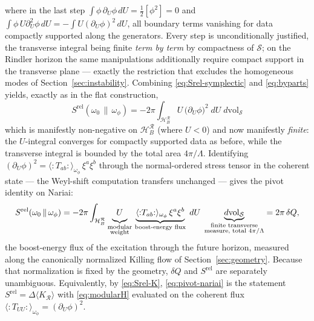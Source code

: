 \documentclass[11pt]{article}
\newcommand{\Srel}{S^{\mathrm{rel}}}
\newcommand{\Nariai}{Nariai}
\begin{document}
where in the last step $\int \phi\,\partial_U\phi\, dU = \tfrac{1}{2}[\phi^2] = 0$ and $\int \phi\, U \partial_U^2\phi\, dU = -\int U (\partial_U\phi)^2\, dU$, all boundary terms vanishing for data compactly supported along the generators. Every step is unconditionally justified, the transverse integral being finite \emph{term by term} by compactness of $\mathcal{S}$; on the Rindler horizon the same manipulations additionally require compact support in the transverse plane --- exactly the restriction that excludes the homogeneous modes of Section~\ref{sec:instability}. Combining \eqref{eq:Srel-symplectic} and \eqref{eq:byparts} yields, exactly as in the flat construction,
\begin{equation}
\boxed{\;
\Srel(\omega_0\,\|\,\omega_\phi)
= -2\pi \int_{\mathcal{H}_B^{\mathcal{R}}} U\, \big(\partial_U \phi\big)^2 \; dU\; d\mathrm{vol}_{\mathcal{S}}
\;}
\label{eq:Srel-nariai}
\end{equation}
which is manifestly non-negative on $\mathcal{H}_B^{\mathcal{R}}$ (where $U < 0$) and now manifestly \emph{finite}: the $U$-integral converges for compactly supported data as before, while the transverse integral is bounded by the total area $4\pi/\Lambda$. Identifying $(\partial_U\phi)^2 = \langle{:}T_{ab}{:}\rangle_{\omega_\phi}\,\xi^a\xi^b$ through the normal-ordered stress tensor in the coherent state --- the Weyl-shift computation transfers unchanged --- gives the pivot identity on \Nariai{}:
\begin{equation}
\Srel(\omega_0\,\|\,\omega_\phi)
= -2\pi \int_{\mathcal{H}_B^{\mathcal{R}}} \underbrace{U\vphantom{\big(}}_{\substack{\text{modular}\\ \text{weight}}}\, \underbrace{\langle{:}T_{ab}{:}\rangle_{\omega_\phi}\, \xi^a \xi^b}_{\text{boost-energy flux}} \; dU\; \underbrace{d\mathrm{vol}_{\mathcal{S}}}_{\substack{\text{finite transverse}\\ \text{measure, total } 4\pi/\Lambda}}
= 2\pi\, \delta Q,
\label{eq:pivot-nariai}
\end{equation}
the boost-energy flux of the excitation through the future horizon, measured along the canonically normalized Killing flow of Section~\ref{sec:geometry}. Because that normalization is fixed by the geometry, $\delta Q$ and $\Srel$ are separately unambiguous. Equivalently, by \eqref{eq:Srel-K}, \eqref{eq:pivot-nariai} is the statement $\Srel = \Delta\langle K_{\mathcal{R}}\rangle$ with \eqref{eq:modularH} evaluated on the coherent flux $\langle{:}T_{UU}{:}\rangle_{\omega_\phi} = (\partial_U\phi)^2$.
\end{document}

